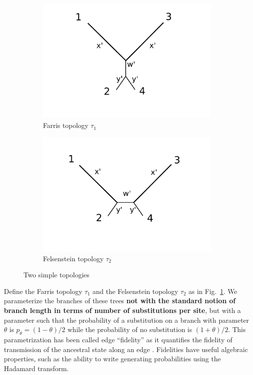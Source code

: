 \documentclass{article}
\begin{document}
\begin{figure}
\centering
\begin{subfigure}{.45\linewidth}
\centering
\includegraphics[width=.95\textwidth]{farris_blank}
\caption[short]{Farris topology $\tau_1$}
\end{subfigure}
\begin{subfigure}{.45\linewidth}
\centering
\includegraphics[width=.95\textwidth]{felsenstein_blank}
\caption[short]{Felsenstein topology $\tau_2$}
\end{subfigure}
\caption{Two simple topologies}
\label{fig:farris-fels-top}
\end{figure}

Define the Farris topology $\tau_1$ and the Felsenstein topology $\tau_2$ as in Fig.~\ref{fig:farris-fels-top}.
We parameterize the branches of these trees \textbf{not with the standard notion of branch length in terms of number of substitutions per site}, but with a parameter such that the probability of a substitution on a branch with parameter $\theta$ is $p_\theta = (1-\theta)/2$ while the probability of no substitution is $(1+\theta)/2$.
This parametrization has been called edge ``fidelity'' as it quantifies the fidelity of transmission of the ancestral state along an edge \cite{Matsen2007-jq}.
Fidelities have useful algebraic properties, such as the ability to write generating probabilities using the Hadamard transform.
\end{document}
